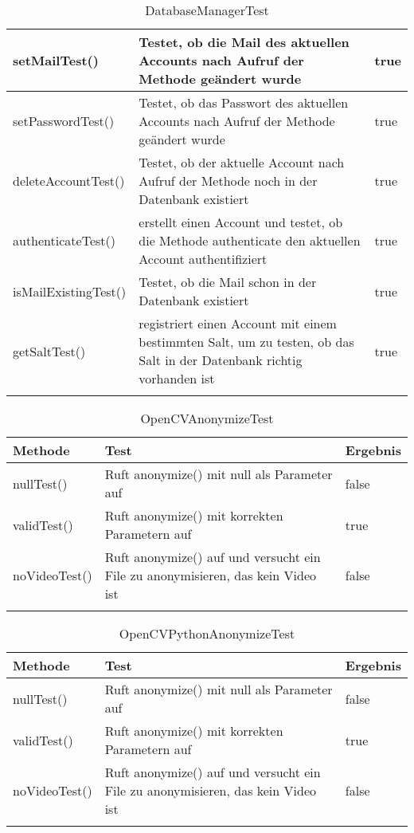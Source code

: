 \begin{longtable}{p{} | p{} | p{}}
  \hline
  setMailTest() & Testet, ob die Mail des aktuellen Accounts nach Aufruf der Methode geändert wurde & true \\
  \hline
  setPasswordTest() & Testet, ob das Passwort des aktuellen Accounts nach Aufruf der Methode geändert wurde & true \\
  \hline
  delete\newline AccountTest() & Testet, ob der aktuelle Account nach Aufruf der Methode noch in der Datenbank existiert & true \\
  \hline
  authenticateTest() & erstellt einen Account und testet, ob die Methode authenticate den aktuellen Account authentifiziert & true \\
  \hline
  isMail\newline ExistingTest() & Testet, ob die Mail schon in der Datenbank existiert & true \\
  \hline
  getSaltTest() & registriert einen Account mit einem bestimmten Salt, um zu testen, ob das Salt in der Datenbank richtig vorhanden ist & true \\
  \hline
  \caption{DatabaseManagerTest}
 \end{longtable}
 
 \begin{longtable}{p{} | p{} | p{}}
\hline
  \textbf{Methode} & \textbf{Test} & \textbf{Ergebnis}\\
  \hline
  nullTest() & Ruft anonymize() mit null als Parameter auf & false\\
  \hline
  validTest() & Ruft anonymize() mit korrekten Parametern auf & true\\
  \hline
  noVideoTest() & Ruft anonymize() auf und versucht ein File zu anonymisieren, das kein Video ist & false\\
  \hline 
  \caption{OpenCVAnonymizeTest}
 \end{longtable}
 
 \begin{longtable}{p{} | p{} | p{}}
\hline
  \textbf{Methode} & \textbf{Test} & \textbf{Ergebnis}\\
  \hline
  nullTest() & Ruft anonymize() mit null als Parameter auf & false\\
  \hline
  validTest() & Ruft anonymize() mit korrekten Parametern auf & true\\
  \hline
  noVideoTest() & Ruft anonymize() auf und versucht ein File zu anonymisieren, das kein Video ist & false\\
  \hline 
  \caption{OpenCVPythonAnonymizeTest}
 \end{longtable}
 
